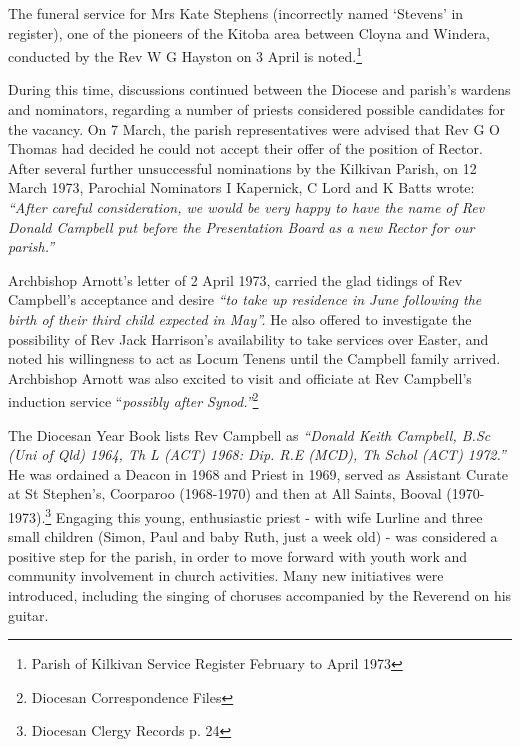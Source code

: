 The funeral service for Mrs Kate Stephens (incorrectly named `Stevens' in register), one of the pioneers of the Kitoba area between Cloyna and Windera, conducted by the Rev W G Hayston on 3 April is noted.\footnote{Parish of Kilkivan Service Register February to April 1973}


During this time, discussions continued between the Diocese and parish's wardens and nominators, regarding a number of priests considered possible candidates for the vacancy. On 7 March, the parish representatives were advised that Rev G O Thomas had decided he could not accept their offer of the position of Rector. After several further unsuccessful nominations by the Kilkivan Parish, on 12 March 1973, Parochial Nominators I Kapernick, C Lord and K Batts wrote: \emph{``After careful consideration, we would be very happy to have the name of Rev Donald Campbell put before the Presentation Board as a new Rector for our parish.''}



Archbishop Arnott's letter of 2 April 1973, carried the glad tidings of Rev Campbell's acceptance and desire \emph{``to take up residence in June following the birth of their third child expected in May''.} He also offered to investigate the possibility of Rev Jack Harrison's availability to take services over Easter, and noted his willingness to act as Locum Tenens until the Campbell family arrived. Archbishop Arnott was also excited to visit and officiate at Rev Campbell's induction service ``\emph{possibly after Synod.''}\footnote{Diocesan Correspondence Files}


The Diocesan Year Book lists Rev Campbell as \emph{``Donald Keith Campbell, B.Sc (Uni of Qld) 1964, Th L (ACT) 1968: Dip. R.E (MCD), Th Schol (ACT) 1972.''} He was ordained a Deacon in 1968 and Priest in 1969, served as Assistant Curate at St Stephen's, Coorparoo (1968-1970) and then at All Saints, Booval (1970-1973).\footnote{Diocesan Clergy Records p. 24} Engaging this young, enthusiastic priest - with wife Lurline and three small children (Simon, Paul and baby Ruth, just a week old) - was considered a positive step for the parish, in order to move forward with youth work and community involvement in church activities. Many new initiatives were introduced, including the singing of choruses accompanied by the Reverend on his guitar.


